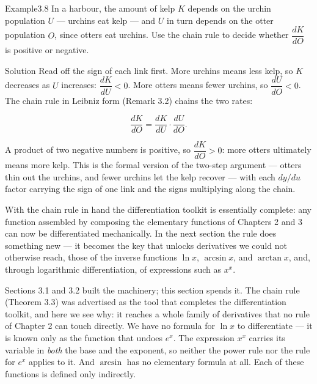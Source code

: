 \begin{hkworkedexample}
\begin{hkexample}{Example}{3.8}{}
In a harbour, the amount of kelp \(K\) depends on the urchin population \(U\) — urchins eat kelp — and \(U\) in turn depends on the otter population \(O\), since otters eat urchins. Use the chain rule to decide whether \(\dfrac{dK}{dO}\) is positive or negative.
\end{hkexample}
\begin{hksolution}{Solution}{}{}
Read off the sign of each link first. More urchins means less kelp, so \(K\) decreases as \(U\) increases: \(\dfrac{dK}{dU} < 0\). More otters means fewer urchins, so \(\dfrac{dU}{dO} < 0\). The chain rule in Leibniz form (Remark 3.2) chains the two rates:

\[ \frac{dK}{dO} = \frac{dK}{dU}\cdot\frac{dU}{dO}. \]

A product of two negative numbers is positive, so \(\dfrac{dK}{dO} > 0\): more otters ultimately means more kelp. This is the formal version of the two-step argument — otters thin out the urchins, and fewer urchins let the kelp recover — with each \(dy/du\) factor carrying the sign of one link and the signs multiplying along the chain.
\end{hksolution}
\end{hkworkedexample}
With the chain rule in hand the differentiation toolkit is essentially complete: any function assembled by composing the elementary functions of Chapters 2 and 3 can now be differentiated mechanically. In the next section the rule does something new — it becomes the key that unlocks derivatives we could not otherwise reach, those of the inverse functions \(\ln x\), \(\arcsin x\), and \(\arctan x\), and, through logarithmic differentiation, of expressions such as \(x^{x}\).


Sections 3.1 and 3.2 built the machinery; this section spends it. The chain rule (Theorem 3.3) was advertised as the tool that completes the differentiation toolkit, and here we see why: it reaches a whole family of derivatives that no rule of Chapter 2 can touch directly. We have no formula for \(\ln x\) to differentiate — it is known only as the function that undoes \(e^{x}\). The expression \(x^{x}\) carries its variable in \emph{both} the base and the exponent, so neither the power rule nor the rule for \(e^{x}\) applies to it. And \(\arcsin\) has no elementary formula at all. Each of these functions is defined only indirectly.

